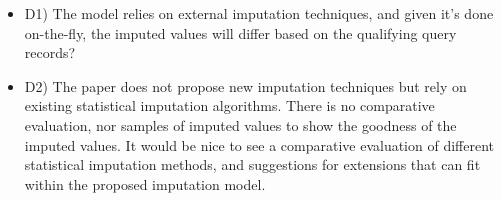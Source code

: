 \documentclass{vldb}
\newcommand{\resp}[1]{{\color{blue}{#1}}}
\begin{document}
\begin{itemize}
  \item D1) The model relies on external imputation techniques, and given it's done on-the-fly, the imputed values will differ based on the qualifying query records?

    \resp{Yes, as discussed in the response to 1.}

  \item D2) The paper does not propose new imputation techniques but rely on existing statistical imputation algorithms. There is no comparative evaluation, nor samples of imputed values to show the goodness of the imputed values. It would be nice to see a comparative evaluation of different statistical imputation methods, and suggestions for extensions that can fit within the proposed imputation model.

    \resp{
      We have added two new imputation methods to the experiments, to show that the planning algorithm can be used successfully with different imputation methods.
      We have also added a subsection to the algorithm section explaining how we chose the cost functions for each imputation method that we test and giving guidelines for choosing cost functions for a new imputation method.
    }
  \end{itemize}
\end{document}
